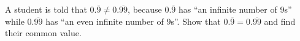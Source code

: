 A student is told that $0.\overline{9}\ne0.\overline{99}$, because $0.\overline{9}$ has ``an infinite number of $9$s'' while $0.\overline{99}$ has ``an even infinite number of $9$s''. Show that $0.\overline{9}=0.\overline{99}$ and find their common value.
